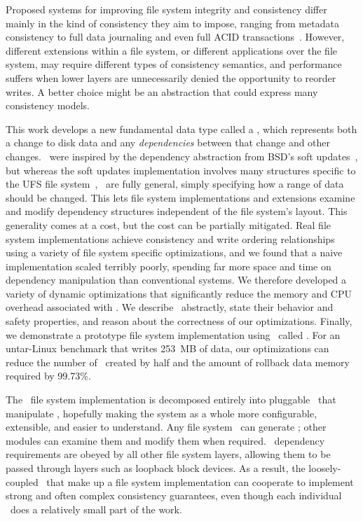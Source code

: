 Proposed systems for improving file system integrity and consistency differ
 mainly in the kind of consistency they aim to impose, ranging from
 metadata consistency to full data journaling
 and even full ACID
 transactions~\cite{gal05transactional,liskov04transactional}.
%
However, different extensions within a file system, or different
 applications over the file system, may require different types of
 consistency semantics, and performance suffers when lower layers are
 unnecessarily denied the opportunity to reorder
 writes.
%
A better choice might be an abstraction that could express many consistency
 models.


This work develops a new fundamental data type called a \emph{\patch},
 which represents both a change to disk data and any \emph{dependencies}
 between that change and other changes. 
%
\Patches\ were inspired by the dependency abstraction from BSD's soft
 updates~\cite{ganger00soft}, but whereas the soft updates implementation
 involves many structures specific to the UFS file
 system~\cite{mckusick99soft}, \patches\ are fully general, simply
 specifying how a range of data should be changed.
%
This lets file system implementations and extensions examine and modify
 dependency structures independent of the file system's layout.
%
This generality comes at a cost, but the cost can be partially mitigated.
%
Real file system implementations achieve consistency and write ordering
 relationships using a variety of file system specific optimizations, and
 we found that a naive implementation scaled terribly poorly, spending far
 more space and time on dependency manipulation than conventional systems.
%
We therefore developed a variety of dynamic optimizations that
 significantly reduce the memory and CPU overhead associated with \patches.
%
We describe \patches\ abstractly, state their behavior and safety
 properties, and reason about the correctness of our optimizations.
%
Finally, we demonstrate a prototype file system implementation using
 \patches\ called \Kudos.
%
For an untar-Linux benchmark that writes 253~MB of data, our optimizations
 can reduce the number of \patches\ created by half and the amount of
 rollback data memory required by 99.73\%. 


The \Kudos\ file system implementation is decomposed entirely into
 pluggable \modules\ that manipulate \patches, hopefully making the system
 as a whole more configurable, extensible, and easier to understand.
%
Any file system \module\ can generate \patches; other modules can examine
 them and modify them when required.
%
\Patch\ dependency requirements are obeyed by all other file system
 layers, allowing them to be passed through layers such as loopback block
 devices.
%
As a result, the loosely-coupled \modules\ that make up a file system
 implementation can cooperate to implement strong and often complex
 consistency guarantees, even though each individual \module\ does a
 relatively small part of the work.


